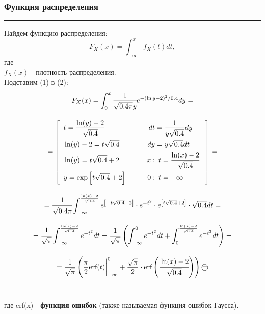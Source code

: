 \documentclass[a4paper, 14pt]{extarticle}
\begin{document}
\subsubsection{Функция распределения}\vspace{-20pt}\rule{\linewidth}{0.1mm}

Найдем функцию распределения:
\begin{equation}
    F_X(x) = \int_{-\infty}^{x} f_X(t) dt,
\end{equation}
где\\
$f_X(x)$ - плотность распределения.\\

Подставим (1) в (2):
\begin{gather*}
    F_X(x) = 
    \int_{0}^{x} \cfrac{1}{\sqrt{0.4 \pi}y} e^{-(\ln{y} - 2)^2 / 0.4} dy = \\[1em]
    = \left[\hspace{5pt}
    \begin{aligned}
        & t          = \frac{\ln(y)-2}{\sqrt{0.4}}          \qquad & dt &   = \frac{1}{y \sqrt{0.4}} dy   \\
        & \ln(y) - 2 = t \sqrt{0.4}                         \qquad & dy &   = y \sqrt{0.4} dt             \\
        & \ln(y)     = t \sqrt{0.4} + 2                     \qquad & x: & \hspace{5pt} t = \frac{\ln(x)-2}{\sqrt{0.4}} \\
        & y          = \exp \left[ t \sqrt{0.4} + 2 \right] \qquad & 0: & \hspace{5pt} t = -\infty                     \\ 
    \end{aligned}\,
    \hspace{5pt}\right] = \\[1em]
    = \cfrac{1}{\sqrt{0.4 \pi}} \int_{-\infty}^{\frac{\ln(x)-2}{\sqrt{0.4}}} e^{\left[ -t \sqrt{0.4} -2 \right]} 
    \cdot e^{-t^2} \cdot e^{\left[ t \sqrt{0.4} +2 \right]} \cdot \sqrt{0.4} dt = \\[1em]
    = \cfrac{1}{\sqrt{\pi}} \int_{-\infty}^{\frac{\ln(x)-2}{\sqrt{0.4}}} e^{-t^2} dt 
    = \frac{1}{\sqrt{\pi}} \left( \int_{-\infty}^{0} e^{-t^2} dt + \int_{0}^{\frac{\ln(x)-2}{\sqrt{0.4}}} e^{-t^2} dt \right) = \\[1em]
    = \frac{1}{\sqrt{\pi}} \left( \frac{\pi}{2} \text{erf} (t) \bigg|^0_{-\infty} + \frac{\sqrt{\pi}}{2} \cdot 
    \text{erf} \left( \cfrac{\ln(x)-2}{\sqrt{0.4}} \right) \right) \oeq
\end{gather*}\\
\vspace{10pt}
\begin{center}
    где erf(x) - \textbf{функция ошибок} (также называемая функция ошибок Гаусса).\\
\end{center}
\end{document}
